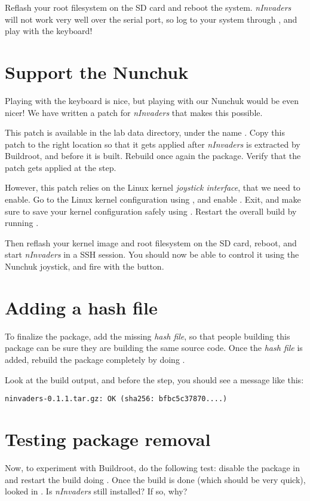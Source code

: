 Reflash your root filesystem on the SD card and reboot the
system. {\em nInvaders} will not work very well over the serial port,
so log to your system through , and play 
with the keyboard!

\section{Support the Nunchuk}

Playing with the keyboard is nice, but playing with our Nunchuk would
be even nicer! We have written a patch for {\em nInvaders} that makes
this possible.

This patch is available in the lab data directory, under the name
. Copy this patch to the right
location so that it gets applied after {\em nInvaders} is extracted by
Buildroot, and before it is built. Rebuild once again the
 package. Verify that the patch gets applied at the
 step.

However, this patch relies on the Linux kernel {\em joystick
  interface}, that we need to enable. Go to the Linux kernel
configuration using , and enable
. Exit, and make sure to save your kernel
configuration safely using . Restart
the overall build by running .

Then reflash your kernel image and root filesystem on the SD card,
reboot, and start {\em nInvaders} in a SSH session. You should now be
able to control it using the Nunchuk joystick, and fire with the
 button.

\section{Adding a hash file}

To finalize the package, add the missing {\em hash file}, so that
people building this package can be sure they are building the same
source code. Once the {\em hash file} is added, rebuild the package
completely by doing .

Look at the build output, and before the  step, you should see a message like this:

\begin{verbatim}
ninvaders-0.1.1.tar.gz: OK (sha256: bfbc5c37870....)
\end{verbatim}

\section{Testing package removal}

Now, to experiment with Buildroot, do the following test: disable the
 package in  and restart the build
doing . Once the build is done (which should be very
quick), looked in . Is {\em nInvaders} still
installed? If so, why?
